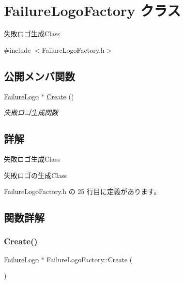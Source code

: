 \hypertarget{class_failure_logo_factory}{}\section{Failure\+Logo\+Factory クラス}
\label{class_failure_logo_factory}


失敗ロゴ生成\+Class  




{\ttfamily \#include $<$Failure\+Logo\+Factory.\+h$>$}

\subsection*{公開メンバ関数}
\begin{DoxyCompactItemize}
\item 
\mbox{\hyperlink{class_failure_logo}{Failure\+Logo}} $\ast$ \mbox{\hyperlink{class_failure_logo_factory_a7fffb323496d64ada61251144372f1b9}{Create}} ()
\begin{DoxyCompactList}\small\item\em 失敗ロゴ生成関数 \end{DoxyCompactList}\end{DoxyCompactItemize}


\subsection{詳解}
失敗ロゴ生成\+Class 

失敗ロゴの生成\+Class 

 Failure\+Logo\+Factory.\+h の 25 行目に定義があります。



\subsection{関数詳解}
\mbox{\label{class_failure_logo_factory_a7fffb323496d64ada61251144372f1b9}} 
\subsubsection{\texorpdfstring{Create()}{Create()}}
{\footnotesize\ttfamily \mbox{\hyperlink{class_failure_logo}{Failure\+Logo}} $\ast$ Failure\+Logo\+Factory\+::\+Create (\begin{DoxyParamCaption}{ }\end{DoxyParamCaption})}



